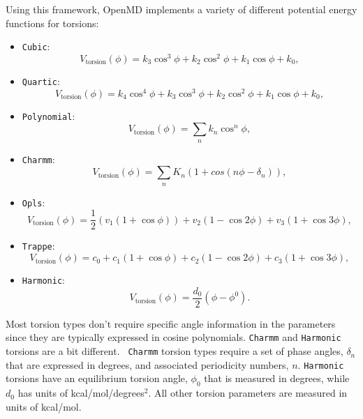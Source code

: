 \documentclass[]{book}
\begin{document}
Using this framework, OpenMD implements a variety of different
potential energy functions for torsions:
\begin{itemize}
\item {\tt Cubic}:
\begin{equation*}
  V_{\text{torsion}}(\phi) =  
  k_3 \cos^3 \phi + k_2 \cos^2 \phi + k_1 \cos \phi + k_0,
\end{equation*}
\item {\tt Quartic}:
\begin{equation*}
  V_{\text{torsion}}(\phi) =  k_4 \cos^4 \phi + 
  k_3 \cos^3 \phi + k_2 \cos^2 \phi + k_1 \cos \phi + k_0,
\end{equation*}
\item {\tt Polynomial}:
\begin{equation*}
V_{\text{torsion}}(\phi) =  \sum_n k_n \cos^n \phi , 
\end{equation*}
\item {\tt Charmm}:
\begin{equation*}
V_{\text{torsion}}(\phi) = \sum_n K_n \left( 1 + cos(n
  \phi - \delta_n) \right),
\end{equation*}
\item {\tt Opls}:
\begin{equation*}
  V_{\text{torsion}}(\phi) =  \frac{1}{2} \left(v_1 (1 + \cos \phi) \right)
    + v_2 (1 - \cos 2 \phi) +  v_3 (1 + \cos 3 \phi),
\end{equation*}
\item {\tt Trappe}:\cite{Siepmann1998}
\begin{equation*}
  V_{\text{torsion}}(\phi) =  c_0 + c_1 (1 + \cos \phi) + c_2 (1 - \cos 2 \phi)  +
  c_3 (1 + \cos 3 \phi),
\end{equation*}
\item {\tt Harmonic}:
\begin{equation*}
V_{\text{torsion}}(\phi) =  \frac{d_0}{2} \left(\phi - \phi^0\right).
\end{equation*}
\end{itemize}

Most torsion types don't require specific angle information in the
parameters since they are typically expressed in cosine polynomials.
{\tt Charmm} and {\tt Harmonic} torsions are a bit different.  {\tt
  Charmm} torsion types require a set of phase angles, $\delta_n$ that
are expressed in degrees, and associated periodicity numbers, $n$.
{\tt Harmonic} torsions have an equilibrium torsion angle, $\phi_0$
that is measured in degrees, while $d_0$ has units of
kcal/mol/degrees$^2$.  All other torsion parameters are measured in
units of kcal/mol.
\end{document}
